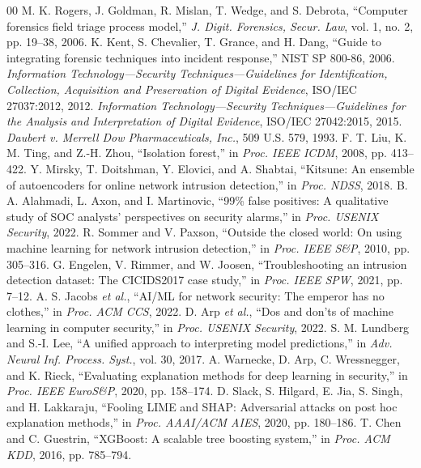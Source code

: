 \documentclass[journal]{IEEEtran}
\begin{document}
\begin{thebibliography}{00}
 M. K. Rogers, J. Goldman, R. Mislan, T. Wedge, and S. Debrota, ``Computer forensics field triage process model,'' \emph{J. Digit. Forensics, Secur. Law}, vol. 1, no. 2, pp. 19--38, 2006.
 K. Kent, S. Chevalier, T. Grance, and H. Dang, ``Guide to integrating forensic techniques into incident response,'' NIST SP 800-86, 2006.
 \emph{Information Technology---Security Techniques---Guidelines for Identification, Collection, Acquisition and Preservation of Digital Evidence}, ISO/IEC 27037:2012, 2012.
 \emph{Information Technology---Security Techniques---Guidelines for the Analysis and Interpretation of Digital Evidence}, ISO/IEC 27042:2015, 2015.
 \emph{Daubert v. Merrell Dow Pharmaceuticals, Inc.}, 509 U.S. 579, 1993.
 F. T. Liu, K. M. Ting, and Z.-H. Zhou, ``Isolation forest,'' in \emph{Proc. IEEE ICDM}, 2008, pp. 413--422.
 Y. Mirsky, T. Doitshman, Y. Elovici, and A. Shabtai, ``Kitsune: An ensemble of autoencoders for online network intrusion detection,'' in \emph{Proc. NDSS}, 2018.
 B. A. Alahmadi, L. Axon, and I. Martinovic, ``99\% false positives: A qualitative study of SOC analysts' perspectives on security alarms,'' in \emph{Proc. USENIX Security}, 2022.
 R. Sommer and V. Paxson, ``Outside the closed world: On using machine learning for network intrusion detection,'' in \emph{Proc. IEEE S\&P}, 2010, pp. 305--316.
 G. Engelen, V. Rimmer, and W. Joosen, ``Troubleshooting an intrusion detection dataset: The CICIDS2017 case study,'' in \emph{Proc. IEEE SPW}, 2021, pp. 7--12.
 A. S. Jacobs \emph{et al.}, ``AI/ML for network security: The emperor has no clothes,'' in \emph{Proc. ACM CCS}, 2022.
 D. Arp \emph{et al.}, ``Dos and don'ts of machine learning in computer security,'' in \emph{Proc. USENIX Security}, 2022.
 S. M. Lundberg and S.-I. Lee, ``A unified approach to interpreting model predictions,'' in \emph{Adv. Neural Inf. Process. Syst.}, vol. 30, 2017.
 A. Warnecke, D. Arp, C. Wressnegger, and K. Rieck, ``Evaluating explanation methods for deep learning in security,'' in \emph{Proc. IEEE EuroS\&P}, 2020, pp. 158--174.
 D. Slack, S. Hilgard, E. Jia, S. Singh, and H. Lakkaraju, ``Fooling LIME and SHAP: Adversarial attacks on post hoc explanation methods,'' in \emph{Proc. AAAI/ACM AIES}, 2020, pp. 180--186.
 T. Chen and C. Guestrin, ``XGBoost: A scalable tree boosting system,'' in \emph{Proc. ACM KDD}, 2016, pp. 785--794.

\end{thebibliography}
\end{document}
